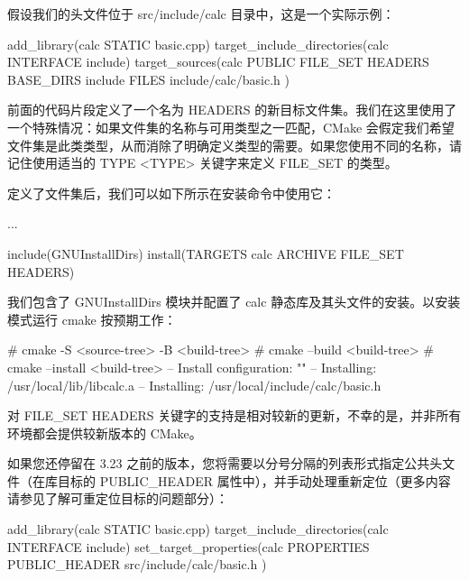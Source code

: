 假设我们的头文件位于 src/include/calc 目录中，这是一个实际示例：


\begin{cmake}
add_library(calc STATIC basic.cpp)
target_include_directories(calc INTERFACE include)
target_sources(calc PUBLIC FILE_SET HEADERS
                           BASE_DIRS include
                           FILES include/calc/basic.h
)
\end{cmake}

前面的代码片段定义了一个名为 HEADERS 的新目标文件集。我们在这里使用了一个特殊情况：如果文件集的名称与可用类型之一匹配，CMake 会假定我们希望文件集是此类类型，从而消除了明确定义类型的需要。如果您使用不同的名称，请记住使用适当的 TYPE <TYPE> 关键字来定义 FILE\_SET 的类型。

定义了文件集后，我们可以如下所示在安装命令中使用它：


\begin{cmake}
...

include(GNUInstallDirs)
install(TARGETS calc ARCHIVE FILE_SET HEADERS)
\end{cmake}

我们包含了 GNUInstallDirs 模块并配置了 calc 静态库及其头文件的安装。以安装模式运行 cmake 按预期工作：

\begin{shell}
# cmake -S <source-tree> -B <build-tree>
# cmake --build <build-tree>
# cmake --install <build-tree>
-- Install configuration: ""
-- Installing: /usr/local/lib/libcalc.a
-- Installing: /usr/local/include/calc/basic.h
\end{shell}

对 FILE\_SET HEADERS 关键字的支持是相对较新的更新，不幸的是，并非所有环境都会提供较新版本的 CMake。

如果您还停留在 3.23 之前的版本，您将需要以分号分隔的列表形式指定公共头文件（在库目标的 PUBLIC\_HEADER 属性中），并手动处理重新定位（更多内容请参见了解可重定位目标的问题部分）：


\begin{cmake}
add_library(calc STATIC basic.cpp)
target_include_directories(calc INTERFACE include)
set_target_properties(calc PROPERTIES
    PUBLIC_HEADER src/include/calc/basic.h
)
\end{cmake}

